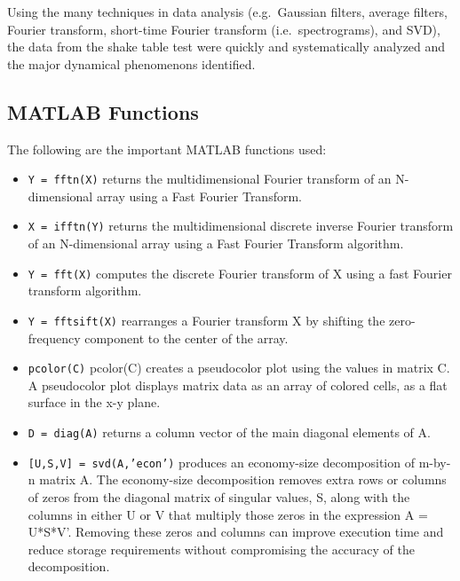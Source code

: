 \documentclass{article}
\begin{document}
\medskip

Using the many techniques in data analysis (e.g.\ Gaussian filters, average filters, Fourier transform, short-time Fourier transform (i.e.\ spectrograms), and SVD), the data from the shake table test were quickly and systematically analyzed and the major dynamical phenomenons identified.

\printbibliography

\begin{appendices}

\section{MATLAB Functions}
The following are the important MATLAB functions used:
\begin{itemize}
     \item \texttt{Y = fftn(X)} returns the multidimensional Fourier transform of an N-dimensional array using a Fast Fourier Transform. 
    
    \item \texttt{X = ifftn(Y)} returns the multidimensional discrete inverse Fourier transform of an N-dimensional array using a Fast Fourier Transform algorithm. 
    
    \item \texttt{Y = fft(X)} computes the discrete Fourier transform of X using a fast Fourier transform algorithm.
    
    \item \texttt{Y = fftsift(X)} rearranges a Fourier transform X by shifting the zero-frequency component to the center of the array.
    
    \item \texttt{pcolor(C)} pcolor(C) creates a pseudocolor plot using the values in matrix C. A pseudocolor plot displays matrix data as an array of colored cells, as a flat surface in the x-y plane.

    \item \texttt{D = diag(A)} returns a column vector of the main diagonal elements of A.
    
    \item \texttt{[U,S,V] = svd(A,'econ')} produces an economy-size decomposition of m-by-n matrix A. The economy-size decomposition removes extra rows or columns of zeros from the diagonal matrix of singular values, S, along with the columns in either U or V that multiply those zeros in the expression A = U*S*V'. Removing these zeros and columns can improve execution time and reduce storage requirements without compromising the accuracy of the decomposition.
    

\end{itemize}
\end{appendices}
\end{document}
